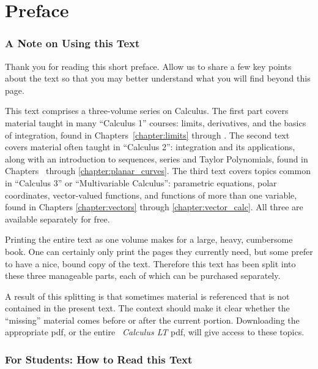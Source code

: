 \prefacegeometry
\chapter*{Preface}
\thispagestyle{empty}

\subsection{A Note on Using this Text}

Thank you for reading this short preface. Allow us to share a few key points about the text so that you may better understand what you will find beyond this page.

This text comprises a three-volume series on Calculus.
The first part covers material taught in many ``Calculus 1'' courses: limits, derivatives, and the basics of integration, found in Chapters~\ref{chapter:limits} through
.
The second text covers material often taught in ``Calculus 2'': integration and its applications, along with an introduction to sequences, series and Taylor Polynomials, found in
Chapters~
through \ref{chapter:planar_curves}. The third text covers topics common in ``Calculus 3'' or ``Multivariable Calculus'': parametric equations, polar coordinates, vector-valued functions, and functions of more than one variable, found in Chapters \ref{chapter:vectors} through \ref{chapter:vector_calc}. All three are available separately for free.

Printing the entire text as one volume makes for a large, heavy, cumbersome book. One can certainly only print the pages they currently need, but some prefer to have a nice, bound copy of the text. Therefore this text has been split into these three manageable parts, each of which can be purchased separately.

A result of this splitting is that sometimes material is referenced that is not contained in the present text. The context should make it clear whether the ``missing'' material comes before or after the current portion. Downloading the appropriate pdf, or the entire \emph{\apex\ Calculus LT} pdf, will give access to these topics.

\subsection{For Students: How to Read this Text}


